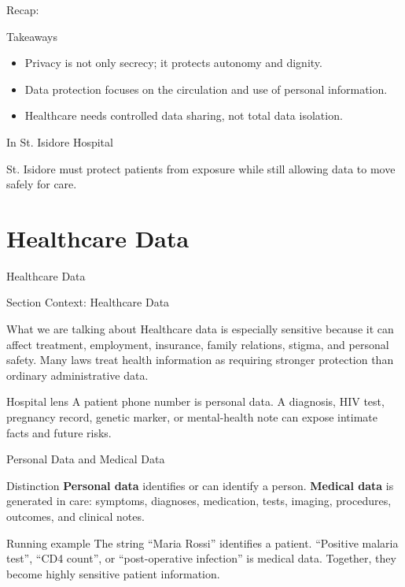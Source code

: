\documentclass[presentation]{beamer}
\newcommand{\sectiontitleframe}[1]{
\begin{frame}[plain,c]
\begin{center}
{\usebeamerfont{title}\usebeamercolor[fg]{title}#1}
\end{center}
\end{frame}
}
\newcommand{\scenario}{St. Isidore Hospital}
\newcommand{\takeawaysframe}[2]{
\begin{frame}[c]{Recap: \insertsection}
\begin{block}{Takeaways}
#1
\end{block}
\begin{exampleblock}{In \scenario}
#2
\end{exampleblock}
\end{frame}
}
\begin{document}
\takeawaysframe{
\begin{itemize}
    \item Privacy is not only secrecy; it protects autonomy and dignity.
    \item Data protection focuses on the circulation and use of personal information.
    \item Healthcare needs controlled data sharing, not total data isolation.
\end{itemize}
}{
St. Isidore must protect patients from exposure while still allowing data to move safely for care.
}

\section{Healthcare Data}
\sectiontitleframe{Healthcare Data}

\begin{frame}[c]{Section Context: Healthcare Data}
\begin{block}{What we are talking about}
Healthcare data is especially sensitive because it can affect treatment, employment, insurance,
family relations, stigma, and personal safety. Many laws treat health information as requiring
stronger protection than ordinary administrative data.
\end{block}

\begin{exampleblock}{Hospital lens}
A patient phone number is personal data. A diagnosis, HIV test, pregnancy record, genetic marker, or
mental-health note can expose intimate facts and future risks.
\end{exampleblock}
\end{frame}

\begin{frame}[c]{Personal Data and Medical Data}
\begin{block}{Distinction}
\textbf{Personal data} identifies or can identify a person. \textbf{Medical data} is generated in
care: symptoms, diagnoses, medication, tests, imaging, procedures, outcomes, and clinical notes.
\end{block}

\begin{exampleblock}{Running example}
The string ``Maria Rossi'' identifies a patient. ``Positive malaria test'', ``CD4 count'', or
``post-operative infection'' is medical data. Together, they become highly sensitive patient
information.
\end{exampleblock}
\end{frame}
\end{document}
